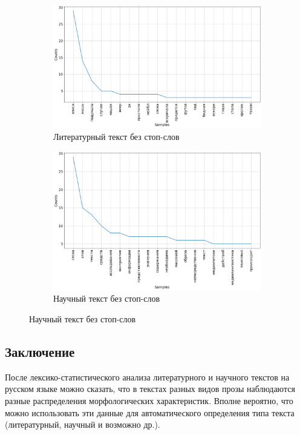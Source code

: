 \documentclass[12pt]{article}
\begin{document}
\begin{figure}
\begin{subfigure}{\textwidth}
\centering
\includegraphics[width=\linewidth]{images/01-3}
\caption{Литературный текст без стоп-слов}
\label{fig:sfig1}
\end{subfigure}
\begin{subfigure}{\textwidth}
\centering
\includegraphics[width=\linewidth]{images/01-4}
\caption{Научный текст без стоп-слов}
\label{fig:sfig2}
\end{subfigure}
\end{figure}

\subsection*{Заключение}

После лексико-статистического анализа литературного и научного текстов на русском языке можно сказать, что в текстах разных видов прозы наблюдаются разные распределения морфологических характеристик. Вполне вероятно, что можно использовать эти данные для автоматического определения типа текста (литературный, научный и возможно др.).
\end{document}
